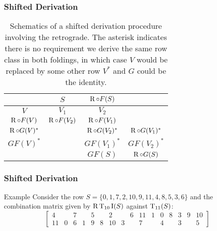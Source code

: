 
\begin{frame}
	\frametitle{Shifted Derivation}
	\begin{table}
    	\caption{Schematics of a shifted derivation procedure involving the retrograde. The asterisk indicates there is no requirement we derive the same row class in both foldings, in which case $V$ would be replaced by some other row $V^*$ and $G$ could be the identity.}
    	\centering
    	\vspace{12pt}
    	\begin{tabular}{ c | c c c }
        	\hline%
        	& $S$ & $\operatorname{R} \circ F(S)$ & \\
        	\hline
        	$V$ & $V_1$ & $V_2$ & \\
        	$\operatorname{R} \circ F(V)$ & $\operatorname{R} \circ F(V_2)$ & $\operatorname{R} \circ F(V_1)$ & \\
        	$\operatorname{R} \circ G(V)^*$ && $\operatorname{R} \circ G(V_2)^*$ & $\operatorname{R} \circ G(V_1)^*$ \\
        	$GF(V)^*$ && $GF(V_1)^*$ & $GF(V_2)^*$ \\
        	\hline
        	&& $GF(S)$ & $\operatorname{R} \circ G(S)$ \\
        	\hline
    	\end{tabular}
	\end{table}
\end{frame}

\begin{frame}
	\frametitle{Shifted Derivation}
	\begin{block}{Example}
		Consider the row $S = \{ 0, 1, 7, 2, 10, 9, 11, 4, 8, 5, 3, 6 \}$ and the combination matrix given by $\operatorname{R}\operatorname{T}_{10}\operatorname{I}(S)$ against $\operatorname{T}_{11}(S)$:
    	\begin{equation*}
        	\left[
        	\begin{array}{cccccccc|cccccccc}
            	4 && 7 && 5 && 2 && 6 & 11 & 1 & 0 & 8 & 3 & 9 & 10 \\
            	11 & 0 & 6 & 1 & 9 & 8 & 10 & 3 && 7 && 4 && 3 && 5
        	\end{array}
        	\right]
    	\end{equation*}
	\end{block}
\end{frame}

